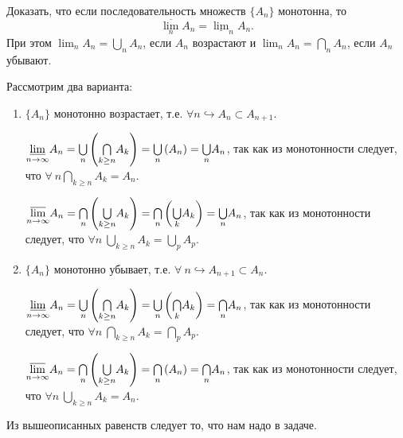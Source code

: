 \begin{task}{2}
Доказать, что если последовательность множеств $\{A_n\}$ монотонна, то
\begin{equation*}
    \overline{\lim_n}A_n  = \underline{\lim}_n A_n.
\end{equation*}
При этом $\lim_n A_n = \bigcup_n A_n$, если $A_n$ возрастают и $\lim_n A_n = \bigcap_n A_n$, если $A_n$ убывают.
\end{task}
\begin{solution}
Рассмотрим два варианта:
\begin{enumerate}
    \item $\lbrace A_n \rbrace$ монотонно возрастает, т.е. $\forall n \hookrightarrow A_n \subset A_{n+1}$.
    
    $ \underset{n \to \infty}{\varliminf} A_n = \underset{n}{\bigcup} \left( \underset{k \geq n}{\bigcap} A_k \right) = \underset{n}{\bigcup} \left(A_n\right) = \underset{n}{\bigcup} A_n$, так как из монотонности следует, что $\forall ~ n \underset{k \geq n}{\bigcap} A_k = A_n$.
    
    $\underset{n \to \infty}{\varlimsup} A_n = \underset{n}{\bigcap} \left( \underset{ k \geq n}{\bigcup} A_k \right) = \underset{n}{\bigcap} \left(\underset{k}{\bigcup} A_k\right) = \underset{n}{\bigcup} A_n$, так как из монотонности следует, что $\forall n ~ \underset{k \geq n}{\bigcup} A_k = \underset{p}{\bigcup} A_p$.
    
    \item $\lbrace A_n \rbrace$ монотонно убывает, т.е. $\forall ~ n \hookrightarrow A_{n+1} \subset A_n$.
    
     $ \underset{n \to \infty}{\varliminf} A_n = \underset{n}{\bigcup} \left( \underset{k \geq n}{\bigcap} A_k \right) = \underset{n}{\bigcup} \left(\underset{k}{\bigcap}A_k\right) = \underset{n}{\bigcap} A_n$, так как из монотонности следует, что $\forall n ~ \underset{k \geq n}{\bigcap} A_k = \underset{p}{\bigcap} A_p$.
    
    $\underset{n \to \infty}{\varlimsup} A_n = \underset{n}{\bigcap} \left( \underset{ k \geq n}{\bigcup} A_k \right) = \underset{n}{\bigcap} \left(A_n\right) = \underset{n}{\bigcap} A_n$, так как из монотонности следует, что $\forall n ~ \underset{k \geq n}{\bigcup} A_k = A_n$.
\end{enumerate}

Из вышеописанных равенств следует то, что нам надо в задаче.
\end{solution}
